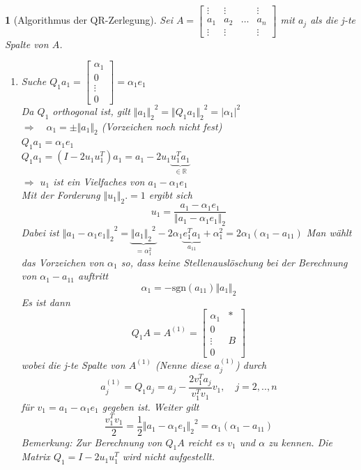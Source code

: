 \documentclass[12pt]{article}
\theoremstyle{break}
\newtheorem{nothing}[theorem]{}
\begin{document}
\begin{nothing}[Algorithmus der QR-Zerlegung]
Sei $A = \left[ \begin{matrix} \vdots & \vdots & & \vdots \\ a_1 & a_2 & \dots & a_n \\ \vdots & \vdots & & \vdots \end{matrix} \right]$ mit $a_j$ als die j-te Spalte von $A$.
\renewcommand{\labelenumi}{\theenumi) }
\begin{enumerate}
  \item Suche $Q_1a_1 = \left[ \begin{matrix} \alpha_1 \\ 0 \\ \vdots \\ 0 \end{matrix} \right] = \alpha_1 e_1$\\
  Da $Q_1$ orthogonal ist, gilt ${\Vert a_1 \Vert_2}^2 = {\Vert Q_1a_1 \Vert_2}^2 = \vert \alpha_1 \vert ^2$\\
  $\Rightarrow \quad \alpha_1 = \pm {\Vert a_1 \Vert _2}$ (Vorzeichen noch nicht fest)\\
  $Q_1a_1 = \alpha_1e_1$ \\
  $Q_1a_1 = (I-2u_1u_1^T)a_1 = a_1 - 2u_1 \underbrace{u_1^Ta_1}_{\in \mathbb{R}}$\\
  $\Rightarrow$ $u_1$ ist ein Vielfaches von $a_1 - \alpha_1 e_1$\\
  Mit der Forderung $\Vert u_1 \Vert_2. = 1 $ ergibt sich
  $$u_1 = \frac{a_1 - \alpha_1e_1}{\Vert a_1 - \alpha_1e_1 \Vert_2}$$
  Dabei ist ${\Vert a_1 - \alpha_1e_1 \Vert_2}^2 = \underbrace{{\Vert a_1 \Vert_2}^2}_{=\alpha_1^2} - 2 \alpha_1 \underbrace{e_1^Ta_1}_{a_{11}} + \alpha_1^2 = 2 \alpha_1 ( \alpha_1 - a_{11})$
  Man wählt das Vorzeichen von $\alpha_1$ so, dass keine Stellenauslöschung bei der Berechnung von $\alpha_1 - a_{11}$ auftritt
  $$\alpha_1 = -\text{sgn}(a_{11}) \Vert a_1 \Vert_2$$
  Es ist dann 
  $$Q_1A= A^{(1)} = \left[ \begin{array}{c|c} \alpha_1 & * \\ \hline 0 \\ \vdots & B \\ 0 \end{array} \right]$$
  wobei die j-te Spalte von $A^{(1)}$ (Nenne diese $a_j^{(1)}$) durch
  $$a_j^{(1)} = Q_1a_j = a_j - \frac{2 v_1^Ta_j}{v_1^Tv_1} v_1, \quad j = 2,..,n$$
  für $v_1 = a_1 - \alpha_1e_1$ gegeben ist. Weiter gilt
  $$ \frac{v_1^Tv_1}{2} = \frac{1}{2} {\Vert a_1 - \alpha_1 e_1 \Vert_2}^2 = \alpha_1(\alpha_1 - a_{11})$$
  Bemerkung: Zur Berechnung von $Q_1A$ reicht es $v_1$ und $\alpha$ zu kennen. Die Matrix $Q_1 = I-2u_1u_1^T$ wird nicht aufgestellt.
  

\end{enumerate}
\end{nothing}
\end{document}
